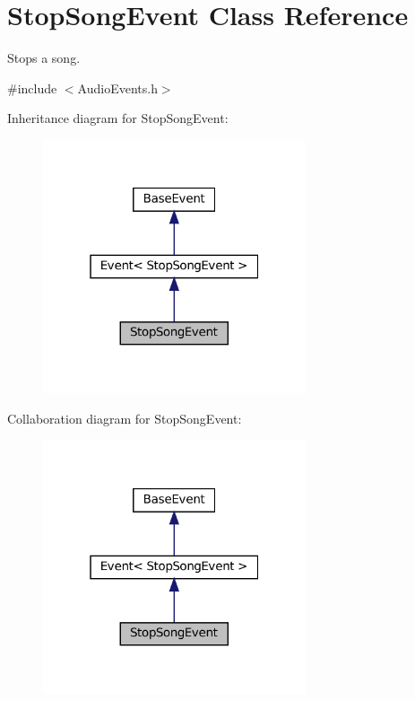 \hypertarget{classStopSongEvent}{}\section{Stop\+Song\+Event Class Reference}
\label{classStopSongEvent}


Stops a song.  




{\ttfamily \#include $<$Audio\+Events.\+h$>$}



Inheritance diagram for Stop\+Song\+Event\+:
\nopagebreak
\begin{figure}[H]
\begin{center}
\leavevmode
\includegraphics[width=220pt]{classStopSongEvent__inherit__graph}
\end{center}
\end{figure}


Collaboration diagram for Stop\+Song\+Event\+:
\nopagebreak
\begin{figure}[H]
\begin{center}
\leavevmode
\includegraphics[width=220pt]{classStopSongEvent__coll__graph}
\end{center}
\end{figure}
